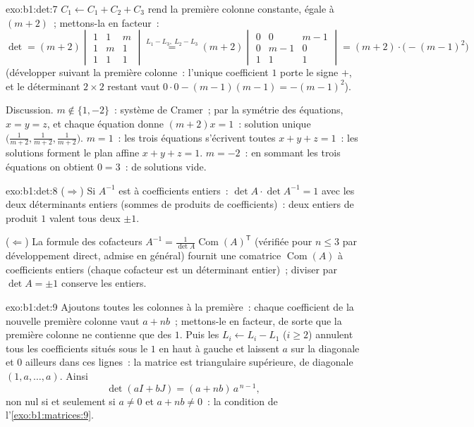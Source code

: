 \begin{solution}{exo:b1:det:7}
$C_1 \leftarrow C_1 + C_2 + C_3$ rend la première colonne constante,
égale à $(m+2)$~; mettons-la en facteur~:
\[
\det = (m+2)\begin{vmatrix}
1 & 1 & m\\ 1 & m & 1\\ 1 & 1 & 1
\end{vmatrix}
\overset{L_1 - L_3,\ L_2 - L_3}{=}
(m+2)\begin{vmatrix}
0 & 0 & m-1\\ 0 & m-1 & 0\\ 1 & 1 & 1
\end{vmatrix}
= (m+2)\cdot\bigl(-(m-1)^2\bigr)
\]
(développer suivant la première colonne~: l'unique coefficient $1$
porte le signe $+$, et le déterminant $2 \times 2$ restant vaut
$0 \cdot 0 - (m-1)(m-1) = -(m-1)^2$).

Discussion. $m \notin \{1, -2\}$~: système de Cramer~; par la symétrie
des équations, $x = y = z$, et chaque équation donne $(m + 2)x = 1$~:
solution unique $\bigl(\frac{1}{m+2}, \frac{1}{m+2},
\frac{1}{m+2}\bigr)$. $m = 1$~: les trois équations s'écrivent toutes
$x + y + z = 1$~: les solutions forment le plan affine $x + y + z = 1$.
$m = -2$~: en sommant les trois équations on obtient $0 = 3$~:
 de solutions vide.
\end{solution}

\begin{solution}{exo:b1:det:8}
($\Rightarrow$) Si $A^{-1}$ est à coefficients entiers~: $\det A \cdot \det
A^{-1} = 1$ avec les deux déterminants entiers (sommes de produits de
coefficients)~: deux entiers de produit $1$ valent tous deux $\pm1$.

($\Leftarrow$) La formule des cofacteurs $A^{-1} = \frac{1}{\det
A}\operatorname{Com}(A)^{\mathsf T}$ (vérifiée pour $n \leq 3$ par
développement direct, admise en général) fournit une comatrice
$\operatorname{Com}(A)$ à coefficients entiers (chaque cofacteur est un
déterminant entier)~; diviser par $\det A = \pm 1$ conserve les
entiers.
\end{solution}

\begin{solution}{exo:b1:det:9}
Ajoutons toutes les colonnes à la première~: chaque coefficient de la
nouvelle première colonne vaut $a + nb$~; mettons-le en facteur, de
sorte que la première colonne ne contienne que des $1$. Puis les
 $L_i \leftarrow L_i - L_1$ ($i \geq 2$)
annulent tous les coefficients situés sous le $1$ en haut à gauche et
laissent $a$ sur la diagonale et $0$ ailleurs dans ces lignes~: la
matrice est triangulaire supérieure, de diagonale $(1, a, \dots, a)$.
Ainsi
\[
\det(aI + bJ) = (a + nb)\, a^{\,n-1} ,
\]
non nul si et seulement si $a \neq 0$ et $a + nb \neq 0$~: la condition
de l'\cref{exo:b1:matrices:9}.
\end{solution}

